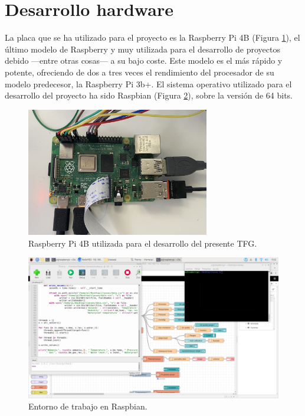 \section{Desarrollo hardware}
\label{sec:deshw}
La placa que se ha utilizado para el proyecto es la Raspberry Pi 4B (Figura \ref{fig:raspberry-placa}), el último modelo de Raspberry y muy utilizada para el desarrollo de proyectos debido ---entre otras cosas--- a su bajo coste. Este modelo es el más rápido y potente, ofreciendo de dos a tres veces el rendimiento del procesador de su modelo predecesor, la Raspberry Pi 3b+. El sistema operativo utilizado para el desarrollo del proyecto ha sido Raspbian (Figura \ref{fig:trabajo}), sobre la versión de 64 bits.\\
\begin{figure} [h!]
  \begin{center}
    \includegraphics[width=8cm]{figs/raspberry}
  \end{center}
  \caption{Raspberry Pi 4B utilizada para el desarrollo del presente TFG.}
  \label{fig:raspberry-placa}
\end{figure}

\begin{figure} [h!]
  \begin{center}
    \includegraphics[width=15cm]{figs/trabajo}
  \end{center}
  \caption{Entorno de trabajo en Raspbian.}
  \label{fig:trabajo}
\end{figure}


